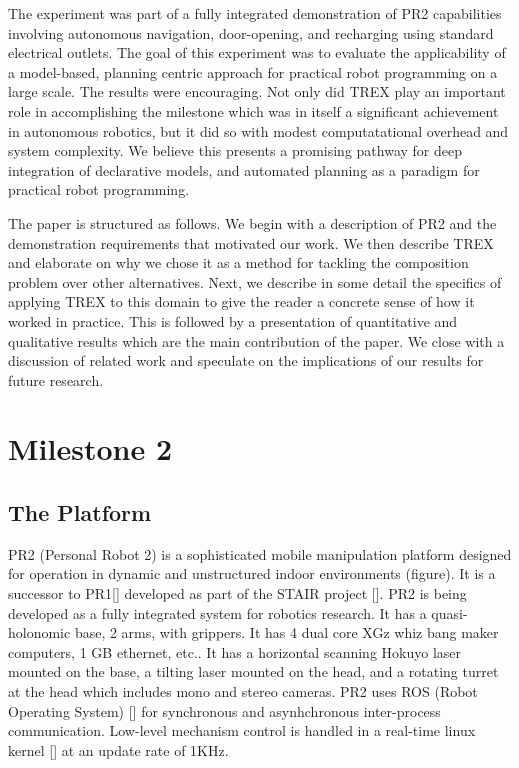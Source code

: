 \documentclass[letterpaper]{article}
\begin{document}
The experiment was part of a fully integrated demonstration of PR2 capabilities involving autonomous navigation, door-opening, and recharging using standard electrical outlets. The goal of this experiment was to evaluate the applicability of a model-based, planning centric approach for practical robot programming on a large scale. The results were encouraging. Not only did TREX play an important role in accomplishing the milestone which was in itself  a significant achievement in autonomous robotics, but it did so with modest computatational overhead and system complexity. We believe this presents a promising pathway for deep integration of declarative models, and automated planning as a paradigm for practical robot programming.

The paper is structured as follows. We begin with a description of PR2 and the demonstration requirements that motivated our work. We then describe TREX and elaborate on why we chose it as a method for tackling the composition problem over other alternatives. Next, we describe in some detail the specifics of applying TREX to this domain to give the reader a concrete sense of how it worked in practice. This is followed by a presentation of quantitative and qualitative results which are the main contribution of the paper. We close with a discussion of related work and speculate on the implications of our results for future research.

\section{Milestone 2}
\subsection{The Platform}
PR2 (Personal Robot 2) is a sophisticated mobile manipulation platform designed for operation in dynamic and unstructured indoor environments (figure). It is a successor to PR1[] developed as part of the STAIR project []. PR2 is being developed as a fully integrated system for robotics research. It has a quasi-holonomic base, 2 arms, with grippers. It has 4 dual core XGz whiz bang maker computers, 1 GB ethernet, etc.. It has a horizontal scanning Hokuyo laser mounted on the base, a tilting laser mounted on the head, and a rotating turret at the head which includes mono and stereo cameras. PR2 uses ROS (Robot Operating System) [] for synchronous and asynhchronous inter-process communication. Low-level mechanism control is handled in a real-time linux kernel [] at an update rate of 1KHz. 
\end{document}
